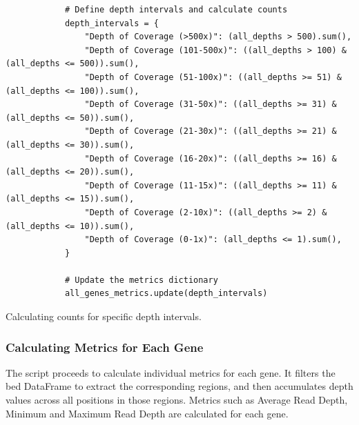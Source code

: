 \begin{longlisting}
\begin{verbatim}
            # Define depth intervals and calculate counts
            depth_intervals = {
                "Depth of Coverage (>500x)": (all_depths > 500).sum(),
                "Depth of Coverage (101-500x)": ((all_depths > 100) & (all_depths <= 500)).sum(),
                "Depth of Coverage (51-100x)": ((all_depths >= 51) & (all_depths <= 100)).sum(),
                "Depth of Coverage (31-50x)": ((all_depths >= 31) & (all_depths <= 50)).sum(),
                "Depth of Coverage (21-30x)": ((all_depths >= 21) & (all_depths <= 30)).sum(),
                "Depth of Coverage (16-20x)": ((all_depths >= 16) & (all_depths <= 20)).sum(),
                "Depth of Coverage (11-15x)": ((all_depths >= 11) & (all_depths <= 15)).sum(),
                "Depth of Coverage (2-10x)": ((all_depths >= 2) & (all_depths <= 10)).sum(),
                "Depth of Coverage (0-1x)": (all_depths <= 1).sum(),
            }

            # Update the metrics dictionary
            all_genes_metrics.update(depth_intervals)
\end{verbatim}
\caption{Calculating counts for specific depth intervals.}
\label{lbl:metrics_intervals}
\end{longlisting}

\subsubsection{\textbf{Calculating Metrics for Each Gene}}

The script proceeds to calculate individual metrics for each gene. It filters the \ac{bed} DataFrame to extract the corresponding regions, and then accumulates depth values across all positions in those regions. Metrics such as Average Read Depth, Minimum and Maximum Read Depth are calculated for each gene.

